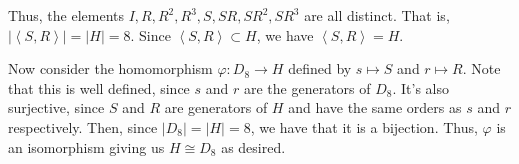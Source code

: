 \documentclass[12 pt, letterpaper]{hmcpset}
\begin{document}
\begin{solution}
	Thus, the elements $I, R, R^{2}, R^{3}, S, SR, SR^{2}, SR^{3}$ are all distinct. That is, $\lvert \left < S, R \right > \rvert = \lvert H \rvert = 8$. Since $\left < S, R \right > \subset H$, we have $\left < S, R \right > = H$. 

	Now consider the homomorphism $\varphi : D_{8} \to H$ defined by $s \mapsto S$ and $r \mapsto R$. Note that this is well defined, since $s$ and $r$ are the generators of $D_{8}$. It's also surjective, since $S$ and $R$ are generators of $H$ and have the same orders as $s$ and $r$ respectively. Then, since $\lvert D_{8} \rvert = \lvert H \rvert = 8$, we have that it is a bijection. Thus, $\varphi$ is an isomorphism giving us $H \cong D_{8}$ as desired.
\end{solution}
\end{document}
